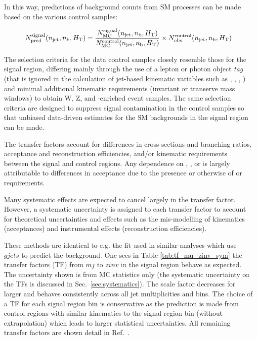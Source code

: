 In this way, predictions of background counts from SM processes can be
made based on the various control samples:

\begin{equation}
  \label{equ:pred-method}
  N_{\textrm{pred}}^{\rm signal}(n_{\text{jet}},n_{\text{b}},\mbox{$H_\text{T}$}) = \frac{N_{\rm MC}^{\rm
      signal}(n_{\text{jet}},n_{\text{b}},\mbox{$H_\text{T}$})}{N_{\rm MC}^{\rm
      control}(n_{\text{jet}},n_{\text{b}},\mbox{$H_\text{T}$})} \times N_{\textrm{obs}}^{\rm
    control}(n_{\text{jet}},n_{\text{b}},\mbox{$H_\text{T}$})   
\end{equation}


The selection criteria for the data control samples closely resemble
those for the signal region, differing mainly through the use of a
lepton or photon object {\it tag} (that is ignored in the calculation
of jet-based kinematic variables such as \scalht, \mht, \alphat, \etc)
and minimal additional kinematic requirements (\eg invariant or
transerve mass windows) to obtain W, Z, and \ttbar-enriched event
samples. The same selection criteria are designed to suppress signal
contamination in the control samples so that unbiased data-driven
estimates for the SM backgrounds in the signal region can be
made. 

The transfer factors account for differences in cross sections and
branching ratios, acceptance and reconstruction efficiencies, and/or
kinematic requirements between the signal and control regions. Any
dependence on \njet, \nb, or \HT is largely attributable to
differences in acceptance due to the presence or otherwise of \alphat
or \mht requirements.

Many systematic effects are expected to cancel largely in the transfer
factor. However, a systematic uncertainty is assigned to each transfer
factor to account for theoretical uncertainties and effects such as
the mis-modelling of kinematics (\eg acceptances) and instrumental
effects (\eg reconstruction efficiencies).

These methods are identical to e.g. the fit used in similar analyses which use $gjets$ to predict the \znunu background. 
One sees in Table \ref{tab:tf_mu_zinv_sym} the transfer factors (TF) from $mj$ to $zinv$ in the signal region behave as expected.
The uncertainty shown is from MC statistics only (the systematic uncertainty on the TFs is discussed in Sec.~\ref{sec:systematics}). 
The scale factor decreases for larger \HT and behaves consistently across all jet multiplicities and \HT bins. 
The choice of a TF for each signal region bin is conservative as the prediction is made from control regions with similar kinematics
to the signal region bin (without extrapolation) which leads to larger statistical uncertainties.
All remaining transfer factors are shown detail in Ref.~\cite{alphaTnote}. 

